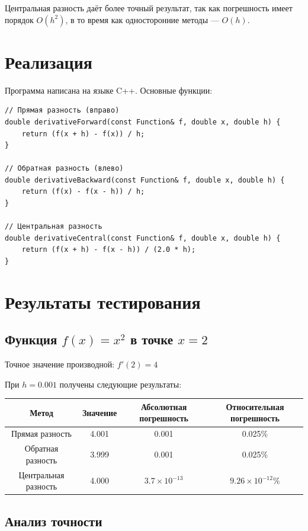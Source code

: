 \documentclass[12pt,a4paper]{article}
\begin{document}
Центральная разность даёт более точный результат, так как погрешность имеет порядок $O(h^2)$, в то время как односторонние методы — $O(h)$.

\section{Реализация}

Программа написана на языке C++. Основные функции:

\begin{lstlisting}
// Прямая разность (вправо)
double derivativeForward(const Function& f, double x, double h) {
    return (f(x + h) - f(x)) / h;
}

// Обратная разность (влево)
double derivativeBackward(const Function& f, double x, double h) {
    return (f(x) - f(x - h)) / h;
}

// Центральная разность
double derivativeCentral(const Function& f, double x, double h) {
    return (f(x + h) - f(x - h)) / (2.0 * h);
}
\end{lstlisting}

\section{Результаты тестирования}

\subsection{Функция $f(x) = x^2$ в точке $x = 2$}

Точное значение производной: $f'(2) = 4$

При $h = 0.001$ получены следующие результаты:

\begin{table}[h!]
\centering
\begin{tabular}{|c|c|c|c|}
\hline
\textbf{Метод} & \textbf{Значение} & \textbf{Абсолютная погрешность} & \textbf{Относительная погрешность} \\
\hline
Прямая разность & 4.001 & 0.001 & 0.025\% \\
Обратная разность & 3.999 & 0.001 & 0.025\% \\
Центральная разность & 4.000 & $3.7 \times 10^{-13}$ & $9.26 \times 10^{-12}\%$ \\
\hline
\end{tabular}
\end{table}

\subsection{Анализ точности}
\end{document}
